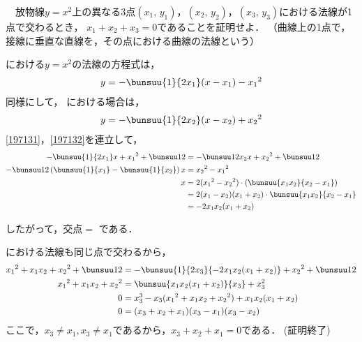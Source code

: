 \begin{problem}
  　放物線$y=x^2$上の異なる3点$(x_1, \, y_1)$，$(x_2, \, y_2)$，$(x_3, \, y_3)$における法線が1点で交わるとき，
$x_1+x_2+x_3=0$であることを証明せよ．
（曲線上の1点で，接線に垂直な直線を，その点における曲線の法線という）
\end{problem}

 における$y=x^2$の法線の方程式は，
\begin{align}
  y = -\bunsuu{1}{2x_1}(x-x_1) - {x_1}^2 \label{197131}
\end{align}
同様にして， における場合は，
\begin{align}
  y = -\bunsuu{1}{2x_2}(x-x_2) + {x_2}^2 \label{197132}
\end{align}
\eqref{197131}，\eqref{197132}を連立して，
\begin{align*}
  -\bunsuu{1}{2x_1}x + {x_1}^2 + \bunsuu12 &= -\bunsuu1{2x_2}x + {x_2}^2 + \bunsuu12\\
  -\bunsuu12\left(\bunsuu{1}{x_1} - \bunsuu{1}{x_2}\right)x &= {x_2}^2 - {x_1}^2\\
  x&=2({x_1}^2-{x_2}^2) \cdot \left(\bunsuu{x_1x_2}{x_2-x_1}\right)\\
  &=2(x_1-x_2)(x_1 + x_2) \cdot \bunsuu{x_1x_2}{x_2-x_1}\\
  &=-2x_1x_2(x_1+x_2)
\end{align*}

したがって，交点$=$
である．

 における法線も同じ点で交わるから，
\begin{align*}
  {x_1}^2 + x_1x_2 + {x_2}^2 + \bunsuu12 &= -\bunsuu{1}{2x_3}\{-2x_1x_2(x_1+x_2)\} + {x_2}^2 + \bunsuu12 \\
  {x_1}^2 + x_1x_2 + {x_2}^2 &= \bunsuu{x_1x_2(x_1+x_2)}{x_3} + x_3^2\\
  0 &= x_3^3 - x_3({x_1}^2 + x_1x_2 + {x_2}^2) + x_1x_2(x_1+x_2) \\
  0 &= (x_3+x_2+x_1)(x_3-x_1)(x_3-x_2)
\end{align*}
ここで，$x_3 \neq x_1, x_3 \neq x_1$であるから，$x_3 + x_2 + x_1 = 0$である．
\hfill
(証明終了)
